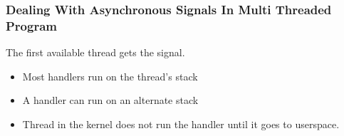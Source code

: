 % 
\begin{frame}[fragile]
    \frametitle{Dealing With Asynchronous Signals In Multi Threaded Program}
The first available thread gets the signal. \pause
    \begin{itemize}
        \item Most handlers run on the thread's stack
        \item A handler can run on an alternate stack \pause
        \item Thread in the kernel does not run the handler until it goes to userspace.
    \end{itemize}
\end{frame}
% 
% 
